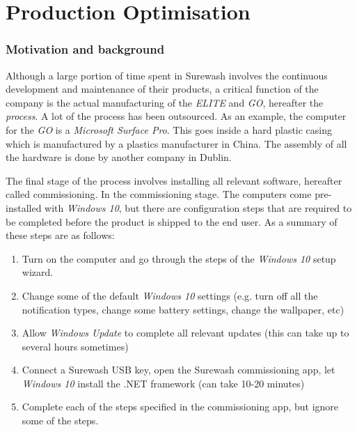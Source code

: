 \part{Production Optimisation}

\section{Motivation and background}
Although a large portion of time spent in Surewash involves the continuous development and maintenance of their products, a critical function of the company is the actual manufacturing of the {\slshape ELITE} and {\slshape GO}, hereafter the {\slshape process}. A lot of the process has been outsourced. As an example, the computer for the {\slshape GO} is a {\slshape Microsoft Surface Pro}. This goes inside a hard plastic casing which is manufactured by a plastics manufacturer in China. The assembly of all the hardware is done by another company in Dublin.

The final stage of the process involves installing all relevant software, hereafter called commissioning. In the commissioning stage. The computers come pre-installed with {\slshape Windows 10}, but there are configuration steps that are required to be completed before the product is shipped to the end user. As a summary of these steps are as follows:
\begin{enumerate}
    \item Turn on the computer and go through the steps of the {\slshape Windows 10} setup wizard.
    \item Change some of the default {\slshape Windows 10} settings (e.g. turn off all the notification types, change some battery settings, change the wallpaper, etc)
    \item Allow {\slshape Windows Update} to complete all relevant updates (this can take up to several hours sometimes)
    \item Connect a Surewash USB key, open the Surewash commissioning app, let {\slshape Windows 10} install the .NET framework (can take 10-20 minutes)
    \item Complete each of the steps specified in the commissioning app, but ignore some of the steps.
\end{enumerate}


